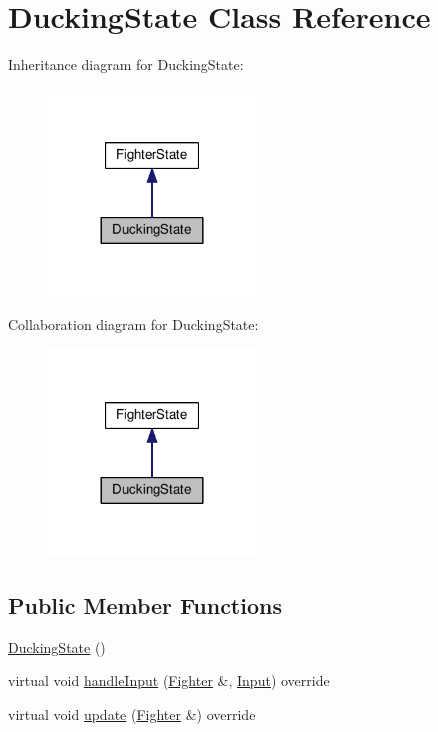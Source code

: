 \hypertarget{classDuckingState}{}\section{Ducking\+State Class Reference}
\label{classDuckingState}


Inheritance diagram for Ducking\+State\+:
\nopagebreak
\begin{figure}[H]
\begin{center}
\leavevmode
\includegraphics[width=156pt]{classDuckingState__inherit__graph}
\end{center}
\end{figure}


Collaboration diagram for Ducking\+State\+:
\nopagebreak
\begin{figure}[H]
\begin{center}
\leavevmode
\includegraphics[width=156pt]{classDuckingState__coll__graph}
\end{center}
\end{figure}
\subsection*{Public Member Functions}
\begin{DoxyCompactItemize}
\item 
\hyperlink{classDuckingState_a62f30e2eac4a71c01d3870cf63899725}{Ducking\+State} ()
\item 
virtual void \hyperlink{classDuckingState_a233ad7f72fa53e13a28a090d097a845b}{handle\+Input} (\hyperlink{classFighter}{Fighter} \&, \hyperlink{State_8cpp_a080a822f0093973313bd644e517a5090}{Input}) override
\item 
virtual void \hyperlink{classDuckingState_a634612b9f2d152c8805366541a775504}{update} (\hyperlink{classFighter}{Fighter} \&) override
\end{DoxyCompactItemize}
